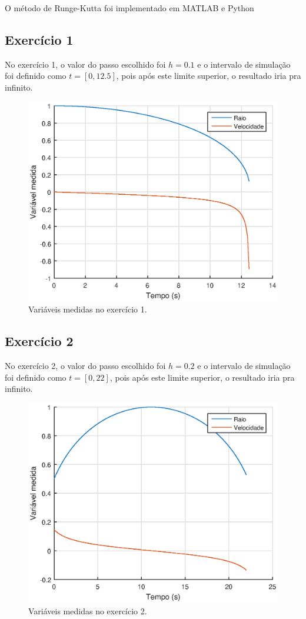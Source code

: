 \documentclass[10pt,a4paper]{article}
\begin{document}
	O método de Runge-Kutta foi implementado em MATLAB e Python
	
	\subsection{Exercício 1}
	No exercício 1, o valor do passo escolhido foi $h=0.1$ e o intervalo de simulação foi definido como $t=[0,12.5]$, pois após este limite superior, o resultado iria pra infinito.    
    
    \begin{figure}[h!]
    \centering
      \includegraphics[width=0.8\linewidth]{figures/ex1h0-1t12-5.eps}
      \caption{Variáveis medidas no exercício 1.}
      \label{fig:ex1h0.1t12.5}
	\end{figure}
    
    \newpage
    \subsection{Exercício 2}
    
    No exercício 2, o valor do passo escolhido foi $h=0.2$ e o intervalo de simulação foi definido como $t=[0,22]$, pois após este limite superior, o resultado iria pra infinito.    
    
    \begin{figure}[h!]
    \centering
      \includegraphics[width=0.8\linewidth]{figures/ex2h0-2t22.eps}
      \caption{Variáveis medidas no exercício 2.}
      \label{fig:ex1h0.1t12.5}
	\end{figure}
    
\end{document}
